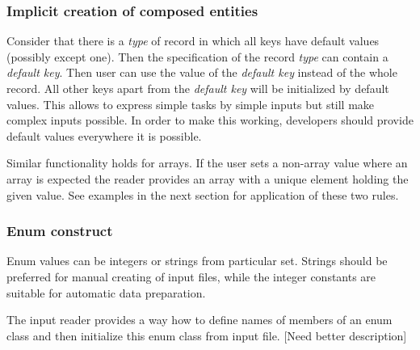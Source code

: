\subsubsection{Implicit creation of composed entities}
Consider that there is a {\it type} of record in which all keys have default values (possibly except one). Then the specification
of the record {\it type} can contain a {\it default key}. Then user can use the value of the {\it default key} instead of the whole record.
All other keys apart from the {\it default key} will be initialized by default values. 
This allows to express simple tasks by simple inputs but still make complex inputs possible. 
In order to make this working, developers should provide default values everywhere it is possible.
 
Similar functionality holds for arrays. If the user sets a non-array value where an array is expected the reader provides an array with a unique element holding the given value.
See examples in the next section for application of these two rules.



\subsubsection{Enum construct}
Enum values can be integers or strings from particular set. Strings should be preferred for manual creating of input files, while 
the integer constants are suitable for automatic data preparation. 

The input reader provides a way how to define names of members of an enum class and then 
initialize this enum class from input file.  [Need better description]

